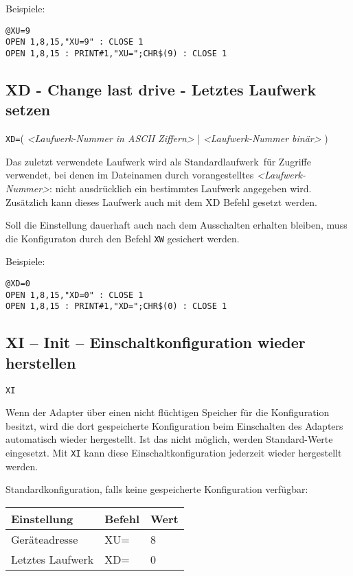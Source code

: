 \documentclass[10pt,a4paper]{scrartcl}		%
\begin{document}
Beispiele:

\begin{verbatim}
@XU=9
OPEN 1,8,15,"XU=9" : CLOSE 1
OPEN 1,8,15 : PRINT#1,"XU=";CHR$(9) : CLOSE 1
\end{verbatim}

\subsection{XD - Change last drive - Letztes Laufwerk setzen}

\texttt{XD=}\Big( \textit{<Laufwerk-Nummer in ASCII Ziffern>} \Big|
\textit{<Laufwerk-Nummer binär>} \Big)

Das zuletzt verwendete Laufwerk wird als \glqq Standardlaufwerk\grqq\  für
Zugriffe verwendet, bei denen im Dateinamen durch vorangestelltes
\textit{<Laufwerk-Nummer>}: nicht ausdrücklich ein bestimmtes
Laufwerk angegeben wird.  
Zusätzlich kann dieses Laufwerk auch mit dem XD Befehl gesetzt werden.

Soll die Einstellung dauerhaft auch nach dem Ausschalten erhalten 
bleiben, muss die Konfiguraton durch den Befehl \texttt{XW} gesichert werden.

Beispiele:

\begin{verbatim}
@XD=0
OPEN 1,8,15,"XD=0" : CLOSE 1
OPEN 1,8,15 : PRINT#1,"XD=";CHR$(0) : CLOSE 1
\end{verbatim}

\subsection{XI -- Init -- Einschaltkonfiguration wieder herstellen}

\texttt{XI}

Wenn der Adapter über einen nicht flüchtigen Speicher für die
Konfiguration besitzt, wird die dort gespeicherte Konfiguration beim
Einschalten des Adapters automatisch wieder hergestellt. 
Ist das nicht möglich, werden Standard-Werte eingesetzt.
Mit \texttt{XI} kann diese Einschaltkonfiguration jederzeit wieder
hergestellt werden.

Standardkonfiguration, falls keine gespeicherte Konfiguration verfügbar:

\begin{tabular}[c]{l l l}
\toprule 
Einstellung & Befehl & Wert\\
\midrule
Geräteadresse		& XU= & 8 \\
Letztes Laufwerk	& XD= & 0 \\
\bottomrule
\end{tabular}
\end{document}
